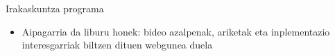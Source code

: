 \documentclass[
 10pt,%
 compress,%
 t,       %
 xcolor=svgnames
]{beamer}
\theoremstyle{definition} \newtheorem{definicion}{Definicion}[section]
\theoremstyle{propiedades} \newtheorem{propiedades}{Propiedades}[section]
\begin{document}
\begin{frame}{Irakaskuntza programa}
{\begin{itemize}
	

\item Aipagarria da liburu honek: bideo azalpenak, ariketak eta inplementazio interesgarriak biltzen dituen webgunea duela

\end{itemize}

}
	
	
\end{frame}










\end{document}

